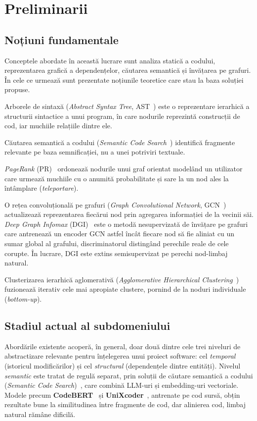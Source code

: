 \documentclass[12pt]{article}
\numberwithin{equation}{section}
\numberwithin{figure}{section}
\numberwithin{table}{section}
\theoremstyle{definition}
\theoremstyle{plain}
\begin{document}
\section{Preliminarii}

\subsection{Noțiuni fundamentale}

Conceptele abordate în această lucrare sunt analiza statică a codului, reprezentarea grafică a dependențelor, căutarea semantică și învățarea pe grafuri. În cele ce urmează sunt prezentate noțiunile teoretice care stau la baza soluției propuse.

Arborele de sintaxă (\textit{Abstract Syntax Tree}, AST~\cite{aho2006compilers}) este o reprezentare ierarhică a structurii sintactice a unui program, în care nodurile reprezintă construcții de cod, iar muchiile relațiile dintre ele.

Căutarea semantică a codului (\textit{Semantic Code Search}~\cite{husain2019codesearchnet}) identifică fragmente relevante pe baza semnificației, nu a unei potriviri textuale.

\textit{PageRank} (PR)~\cite{page1999pagerank} ordonează nodurile unui graf orientat modelând un utilizator care urmează muchiile cu o anumită probabilitate și sare la un nod ales la întâmplare (\textit{teleportare}).

O rețea convoluțională pe grafuri (\textit{Graph Convolutional Network}, GCN~\cite{kipf2017gcn}) actualizează reprezentarea fiecărui nod prin agregarea informației de la vecinii săi.
\textit{Deep Graph Infomax} (DGI)~\cite{velickovic2019dgi} este o metodă nesupervizată de învățare pe grafuri care antrenează un encoder GCN astfel încât fiecare nod să fie aliniat cu un sumar global al grafului, discriminatorul distingând perechile reale de cele corupte. În lucrare, DGI este extins semisupervizat pe perechi nod-limbaj natural.

Clusterizarea ierarhică aglomerativă (\textit{Agglomerative Hierarchical Clustering}~\cite{ward1963hierarchical}) fuzionează iterativ cele mai apropiate clustere, pornind de la noduri individuale (\textit{bottom-up}).

\subsection{Stadiul actual al subdomeniului}

Abordările existente acoperă, în general, doar două dintre cele trei niveluri de abstractizare relevante pentru înțelegerea unui proiect software: cel \textit{temporal} (istoricul modificărilor) și cel \textit{structural} (dependențele dintre entități). Nivelul \textit{semantic} este tratat de regulă separat, prin soluții de căutare semantică a codului (\textit{Semantic Code Search})~\cite{husain2019codesearchnet}, care combină LLM-uri și embedding-uri vectoriale. Modele precum \textbf{CodeBERT}~\cite{feng2020codebert} și \textbf{UniXcoder}~\cite{guo2022unixcoder}, antrenate pe cod sursă, obțin rezultate bune la similitudinea între fragmente de cod, dar alinierea cod, limbaj natural rămâne dificilă.
\end{document}
